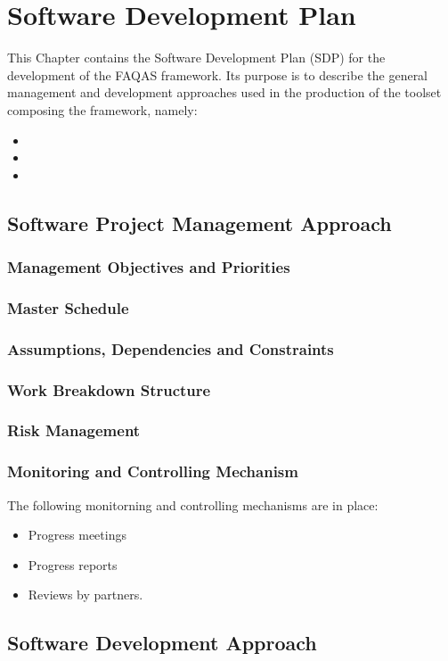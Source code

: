 \chapter{Software Development Plan}

This Chapter contains the Software Development Plan (SDP) for the development of the FAQAS framework. Its purpose is to describe the general management and development approaches used in the production of the toolset composing the framework, namely:
\begin{itemize}
  \item \MASS
  \item \DAMA
  \item \SEMUS
\end{itemize}

\section{Software Project Management Approach}

\subsection{Management Objectives and Priorities}

\subsection{Master Schedule}

\subsection{Assumptions, Dependencies and Constraints}

\subsection{Work Breakdown Structure}

\subsection{Risk Management}

\subsection{Monitoring and Controlling Mechanism}

The following monitorning and controlling mechanisms are in place:
\begin{itemize}
  \item Progress meetings
  \item Progress reports
  \item Reviews by partners.
\end{itemize}

\section{Software Development Approach}

